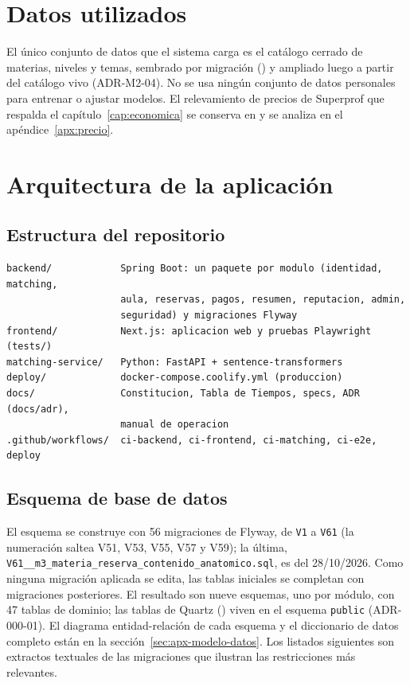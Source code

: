\section{Datos utilizados}

El único conjunto de datos que el sistema carga es el catálogo cerrado
de materias, niveles y temas, sembrado por migración
() y ampliado luego a partir del
catálogo vivo (ADR-M2-04). No se usa ningún conjunto de datos personales
para entrenar o ajustar modelos. El relevamiento de precios de Superprof
que respalda el capítulo~\ref{cap:economica} se conserva en
 y se analiza en el
apéndice~\ref{apx:precio}.

\section{Arquitectura de la aplicación}

\subsection{Estructura del repositorio}

\begin{lstlisting}[caption={Carpetas principales del repositorio del sistema}, label={lst:dependencias}]
backend/            Spring Boot: un paquete por modulo (identidad, matching,
                    aula, reservas, pagos, resumen, reputacion, admin,
                    seguridad) y migraciones Flyway
frontend/           Next.js: aplicacion web y pruebas Playwright (tests/)
matching-service/   Python: FastAPI + sentence-transformers
deploy/             docker-compose.coolify.yml (produccion)
docs/               Constitucion, Tabla de Tiempos, specs, ADR (docs/adr),
                    manual de operacion
.github/workflows/  ci-backend, ci-frontend, ci-matching, ci-e2e, deploy
\end{lstlisting}

\subsection{Esquema de base de datos}

El esquema se construye con 56 migraciones de Flyway, de \texttt{V1} a
\texttt{V61} (la numeración saltea V51, V53, V55, V57 y V59); la última,
\texttt{V61\_\_m3\_materia\_reserva\_contenido\_anatomico.sql}, es del 28/10/2026. Como
ninguna migración aplicada se edita, las tablas iniciales se completan con
migraciones posteriores. El resultado son nueve esquemas, uno por módulo,
con 47 tablas de dominio; las tablas de Quartz () viven en el
esquema \texttt{public} (ADR-000-01). El diagrama entidad-relación de cada
esquema y el diccionario de datos completo están en la
sección~\ref{sec:apx-modelo-datos}. Los listados siguientes son extractos
textuales de las migraciones que ilustran las restricciones más
relevantes.

